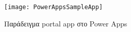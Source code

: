                 \begin{figure}[h!] \noindent \centering
                        \texttt{[image: PowerAppsSampleApp]}
                        \caption{\centering Παράδειγμα portal app στο Power Apps}
                \end{figure}

